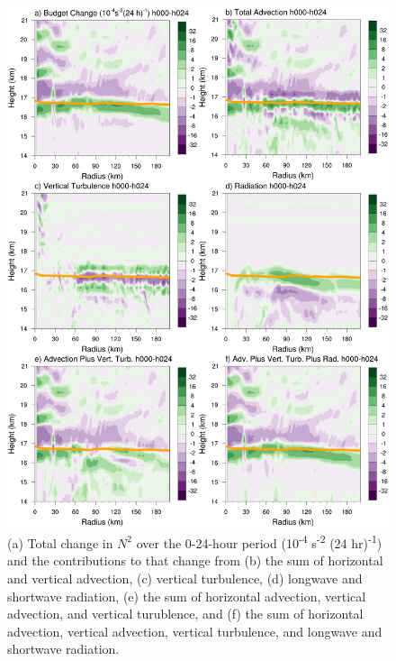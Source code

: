\documentclass{ametsoc}
\begin{document}
\begin{figure}[ht]
\centerline{\includegraphics[width=27pc]{figures/h000-h024-budgetterms.png}}
\caption{(a) Total change in $N^2$ over the 0-24-hour period (10\textsuperscript{-4} s\textsuperscript{-2} (24 hr)\textsuperscript{-1}) and the contributions to that change from (b) the sum of horizontal and vertical advection, (c) vertical turbulence, (d) longwave and shortwave radiation, (e) the sum of horizontal advection, vertical advection, and vertical turublence, and (f) the sum of horizontal advection, vertical advection, vertical turbulence, and longwave and shortwave radiation.}
\label{fig:stab-00-24}
\end{figure}
\end{document}
